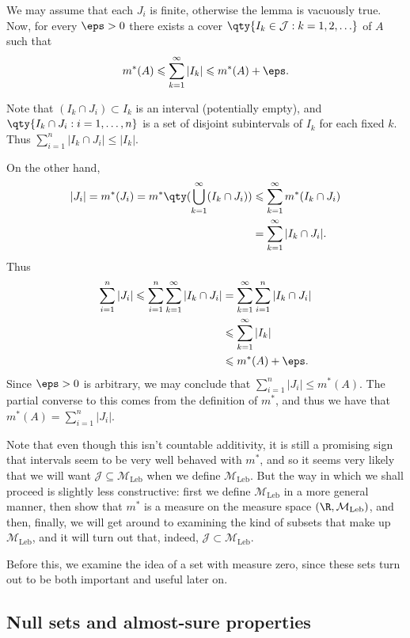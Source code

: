 \documentclass{maths}
\newcommand{\mleb}{\mathcal{M}_{\text{Leb}}}
\newcommand{\intvl}{\mathcal{J}}
\begin{document}
\begin{prf}
    We may assume that each $J_i$ is finite, otherwise the lemma is vacuously true.
    Now, for every $\eps>0$ there exists a cover $\qty{I_k\in\intvl : k = 1,2,\ldots}$ of $A$ such that
    \[
        m^*(A) \leqslant
        \sum_{k=1}^{\infty} |I_k| \leqslant
        m^*(A) + \eps.
    \]

    Note that $(I_k\cap J_i)\subset I_k$ is an interval (potentially empty), and $\qty{I_k\cap J_i : i = 1,\ldots,n}$ is a set of disjoint subintervals of $I_k$ for each fixed $k$.
    Thus $\sum_{i=1}^n |I_k\cap J_i| \leqslant |I_k|$.

    On the other hand,
    \begin{align*}
        |J_i| =
        m^*(J_i) =
        m^*\qty(\bigcup_{k=1}^{\infty} (I_k\cap J_i))
        &\leqslant \sum_{k=1}^{\infty} m^*(I_k\cap J_i)\\
        &= \sum_{k=1}^{\infty} |I_k\cap J_i|.
    \end{align*}
    Thus
    \begin{align*}
        \sum_{i=1}^n |J_i| \leqslant
        \sum_{i=1}^n\sum_{k=1}^{\infty} |I_k\cap J_i|
        &= \sum_{k=1}^{\infty}\sum_{i=1}^n |I_k\cap J_i|\\
        &\leqslant \sum_{k=1}^{\infty} |I_k|\\
        &\leqslant m^*(A) + \eps.
    \end{align*}
    Since $\eps>0$ is arbitrary, we may conclude that $\sum_{i=1}^n |J_i| \leqslant m^*(A)$.
    The partial converse to this comes from the definition of $m^*$, and thus we have that $m^*(A)=\sum_{i=1}^n |J_i|$.
\end{prf}

Note that even though this isn't countable additivity, it is still a promising sign that intervals seem to be very well behaved with $m^*$, and so it seems very likely that we will want $\intvl\subseteq\mleb$ when we define $\mleb$.
But the way in which we shall proceed is slightly less constructive: first we define $\mleb$ in a more general manner, then show that $m^*$ is a measure on the measure space $(\R,\mleb)$, and then, finally, we will get around to examining the kind of subsets that make up $\mleb$, and it will turn out that, indeed, $\intvl\subset\mleb$.

Before this, we examine the idea of a set with measure zero, since these sets turn out to be both important and useful later on.

\subsection{Null sets and almost-sure properties}
\end{document}
